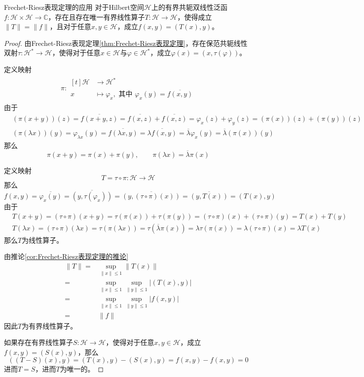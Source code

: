 \documentclass[lang = cn, scheme = chinese, thmcnt = section]{elegantbook}
\newcommand{\C}{\mathbb{C}}  		   %
\begin{document}
\begin{theorem}{}{Frechet-Riesz表现定理的应用}
	对于Hilbert空间$\mathcal{H}$上的有界共轭双线性泛函$f:\mathcal{H}\times \mathcal{H}\to\C$，存在且存在唯一有界线性算子$T:\mathcal{H}\to\mathcal{H}$，使得成立$\|T\|=\|f\|$，且对于任意$x,y\in \mathcal{H}$，成立$f(x,y)=(T(x),y)$。
\end{theorem}

\begin{proof}
	由Frechet-Riesz表现定理\ref{thm:Frechet-Riesz表现定理}，存在保范共轭线性双射$\tau:\mathcal{H}^*\to \mathcal{H}$，使得对于任意$x\in\mathcal{H}$与$\varphi\in \mathcal{H}^*$，成立$\varphi(x)=(x,\tau(\varphi))$。
	
	定义映射
	\begin{align*}
		\pi:\begin{aligned}[t]
			\mathcal{H}&\longrightarrow \mathcal{H}^*\\
			x&\longmapsto \varphi_x,\text{ 其中 }\varphi_x(y)=\overline{f(x,y)}
		\end{aligned}
	\end{align*}
	由于
	\begin{align*}
		&(\pi(x+y))(z)=\overline{f(x+y,z)}=\overline{f(x,z)}+\overline{f(x,z)}=\varphi_{x}(z)+\varphi_{y}(z)=(\pi(x))(z)+(\pi(y))(z)\\
		&(\pi(\lambda x))(y)=\varphi_{\lambda x}(y)=\overline{f(\lambda x,y)}=\overline{\lambda f(x,y)}=\overline{\lambda}\varphi_{x}(y)=\overline{\lambda}(\pi(x))(y)
	\end{align*}
	那么
	$$
	\pi(x+y)=\pi(x)+\pi(y),\qquad 
	\pi(\lambda x)=\overline{\lambda}\pi(x)
	$$
	
	定义映射
	$$
	T=\tau\circ \pi:\mathcal{H}\to \mathcal{H}
	$$
	那么
	$$
	f(x,y)=\overline{\varphi_x(y)}=\overline{(y,\tau(\varphi_x))}=\overline{(y,(\tau\circ \pi)(x))}=\overline{(y,T(x))}=(T(x),y)
	$$
	由于
	\begin{align*}
		&T(x+y)=(\tau\circ \pi)(x+y)=\tau(\pi(x))+\tau(\pi(y))=(\tau\circ \pi)(x)+(\tau\circ \pi)(y)=T(x)+T(y)\\
		&T(\lambda x)=(\tau\circ \pi)(\lambda x)=\tau(\pi(\lambda x))=\tau(\overline{\lambda }\pi(x))=\lambda \tau(\pi(x))=\lambda (\tau\circ \pi)(x)=\lambda T(x)
	\end{align*}
	那么$T$为线性算子。
	
	由推论\ref{cor:Frechet-Riesz表现定理的推论}
	\begin{align*}
		\|T\| = & \sup_{\|x\|\le 1}\|T(x)\|\\
		= & \sup_{\|x\|\le 1}\sup_{\|y\|\le 1}|(T(x),y)|\\
		= & \sup_{\|x\|\le 1}\sup_{\|y\|\le 1}|f(x,y)|\\
		= & \|f\|
	\end{align*}
	因此$T$为有界线性算子。
	
	如果存在有界线性算子$S:\mathcal{H}\to\mathcal{H}$，使得对于任意$x,y\in \mathcal{H}$，成立$f(x,y)=(S(x),y)$，那么
	$$
	((T-S)(x),y)=(T(x),y)-(S(x),y)=f(x,y)-f(x,y)=0
	$$
	进而$T=S$，进而$T$为唯一的。
\end{proof}
\end{document}
